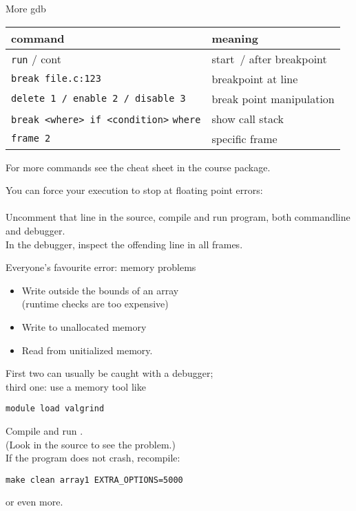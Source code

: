 \documentclass[11pt,headernav]{beamer}
\newcounter{tacc}
\begin{document}
\begin{frame}{More gdb}
  \begin{tabular}{|l|l|}
    \hline
    command&meaning\\
    \hline
    \texttt{run} / cont&start~/ after breakpoint\\
    \texttt{break file.c:123}&breakpoint at line\\
    \texttt{delete 1 / enable 2 / disable 3}&break point manipulation\\
    \texttt{break <where> if <condition>}
    \texttt{where}&show call stack\\
    \texttt{frame 2}&specific frame\\
    \hline
  \end{tabular}

  For more commands see the cheat sheet in the course package.
\end{frame}

\begin{exerciseframe}[roots]
  You can force your execution to stop at floating point errors:\\
  \\
  Uncomment that line in the source, compile and run program,
  both commandline and debugger.\\
  In the debugger, inspect the offending line in all frames.
\end{exerciseframe}

\begin{frame}[containsverbatim]{Everyone's favourite error: memory problems}
  \begin{itemize}
  \item Write outside the bounds of an array\\
    (runtime checks are too expensive)
  \item Write to unallocated memory
  \item Read from unitialized memory.
  \end{itemize}
  First two can usually be caught with a debugger;\\
  third one: use a memory tool like 
\begin{tacc}
\begin{verbatim}
module load valgrind
\end{verbatim}
\end{tacc}
\end{frame}

\begin{exerciseframe}[array1]
  Compile and run .\\
  (Look in the source to see the problem.)\\
  If the program does not crash, recompile:
\begin{verbatim}
make clean array1 EXTRA_OPTIONS=5000
\end{verbatim}
or even more.
\end{exerciseframe}
\end{document}
